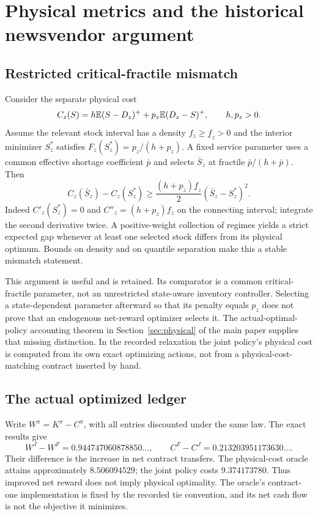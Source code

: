 \section{Physical metrics and the historical newsvendor argument}\label{ec:physical-history}
\subsection{Restricted critical-fractile mismatch}
Consider the separate physical cost
\[
 C_z(S)=h\mathbb E(S-D_z)^++p_z\mathbb E(D_z-S)^+,\qquad h,p_z>0.
\]
Assume the relevant stock interval has a density $f_z\geq\underline f_z>0$ and the interior minimizer $S_z^*$ satisfies $F_z(S_z^*)=p_z/(h+p_z)$. A fixed service parameter uses a common effective shortage coefficient $\bar p$ and selects $\bar S_z$ at fractile $\bar p/(h+\bar p)$. Then
\begin{equation}
 C_z(\bar S_z)-C_z(S_z^*)\geq\frac{(h+p_z)\underline f_z}{2}(\bar S_z-S_z^*)^2.
\end{equation}
Indeed $C'_z(S_z^*)=0$ and $C''_z=(h+p_z)f_z$ on the connecting interval; integrate the second derivative twice. A positive-weight collection of regimes yields a strict expected gap whenever at least one selected stock differs from its physical optimum. Bounds on density and on quantile separation make this a stable mismatch statement.

This argument is useful and is retained. Its comparator is a common critical-fractile parameter, not an unrestricted state-aware inventory controller. Selecting a state-dependent parameter afterward so that its penalty equals $p_z$ does not prove that an endogenous net-reward optimizer selects it. The actual-optimal-policy accounting theorem in Section~\ref{sec:physical} of the main paper supplies that missing distinction. In the recorded relaxation the joint policy's physical cost is computed from its own exact optimizing actions, not from a physical-cost-matching contract inserted by hand.

\subsection{The actual optimized ledger}
Write $W^\pi=K^\pi-C^\pi$, with all entries discounted under the same law. The exact results give
\[
 W^J-W^F=0.944747060878850\ldots,\qquad C^F-C^J=0.213203951173630\ldots.
\]
Their difference is the increase in net contract transfers. The physical-cost oracle attains approximately $8.506094529$; the joint policy costs $9.374173780$. Thus improved net reward does not imply physical optimality. The oracle's contract-one implementation is fixed by the recorded tie convention, and its net cash flow is not the objective it minimizes.

